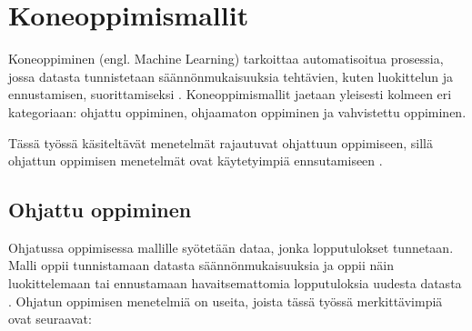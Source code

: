 \documentclass[utf8, bachelor]{gradu3}
\begin{document}
\section{Koneoppimismallit}

Koneoppiminen (engl. Machine Learning) tarkoittaa automatisoitua prosessia, jossa datasta tunnistetaan säännönmukaisuuksia 
tehtävien, kuten luokittelun ja ennustamisen, suorittamiseksi \parencite{black_introduction_2023}. Koneoppimismallit jaetaan 
yleisesti kolmeen eri kategoriaan: ohjattu oppiminen, ohjaamaton oppiminen ja vahvistettu oppiminen. 

Tässä työssä käsiteltävät menetelmät rajautuvat ohjattuun oppimiseen, sillä ohjattun oppimisen menetelmät ovat käytetyimpiä ennsutamiseen \parencite{singh_machine_2021}.

\subsection{Ohjattu oppiminen}

Ohjatussa oppimisessa mallille syötetään dataa, jonka lopputulokset tunnetaan. Malli oppii tunnistamaan datasta säännönmukaisuuksia ja oppii näin luokittelemaan tai ennustamaan 
havaitsemattomia lopputuloksia uudesta datasta \parencite{black_introduction_2023}. Ohjatun oppimisen menetelmiä on useita, joista tässä työssä merkittävimpiä ovat seuraavat:
\end{document}
